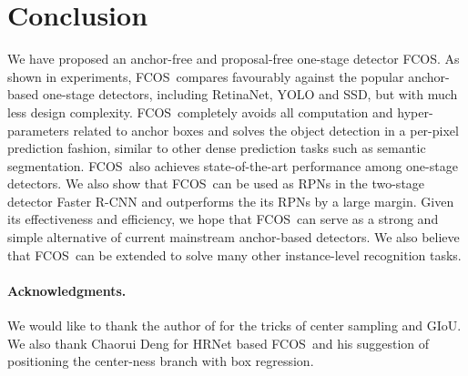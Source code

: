 \documentclass[10pt,twocolumn,letterpaper]{article}
\newcommand{\1}{{\mathbbm{1}}}           %
\def\Ours{{FCNDet}\xspace}
\def\Ours{{FCOS}\xspace}
\begin{document}
\section{Conclusion}
We have proposed an anchor-free and proposal-free one-stage detector \Ours. As shown in experiments, \Ours\ compares favourably against the popular anchor-based one-stage detectors, including RetinaNet, YOLO and SSD, but with much less design complexity. \Ours\ completely avoids all computation and hyper-parameters related to anchor boxes and solves the object detection in a per-pixel prediction fashion, similar to other dense prediction tasks such as semantic segmentation.  \Ours\ also achieves state-of-the-art performance among one-stage detectors. We also show that \Ours\ can be used as RPNs in the two-stage detector Faster R-CNN and outperforms the its RPNs by a large margin. Given its effectiveness and efficiency, we hope that \Ours\ can serve as a strong and simple alternative of current mainstream anchor-based detectors. We also believe that \Ours\ can be extended to solve many other instance-level recognition tasks.









\paragraph{Acknowledgments.} We would like to thank the author of \cite{fcosplus} for %
the tricks of 
center sampling and GIoU. We also thank Chaorui Deng for HRNet based \Ours\ and his suggestion of positioning the center-ness branch with box regression. 

%



{\small
 

}
\end{document}
